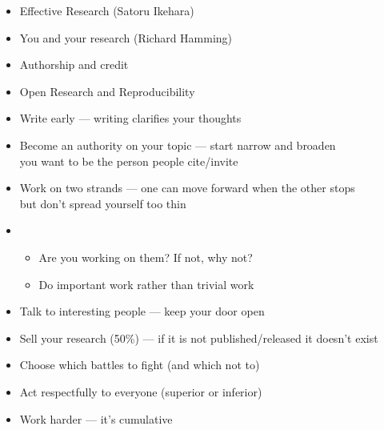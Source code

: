 \documentclass[a4paper,landscape,headrule,footrule,dvips]{foils}
\begin{document}
\begin{CJK}{UTF8}{min}
\maketitle

%



\begin{itemize}
\item Effective Research (Satoru Ikehara)
\item You and your research (Richard Hamming)
\item Authorship and credit
\item Open Research and Reproducibility
\end{itemize}


\begin{itemize}
\item Write early --- writing clarifies your thoughts
\item Become an authority on your topic --- start narrow and broaden
  \\ you want to be the person people cite/invite 
\item Work on two strands --- one can move forward when the other stops
  \\ but don't spread yourself too thin
\end{itemize}


\begin{itemize}
\item {}
  \begin{itemize}
  \item Are you working on them? If not, why not?
  \item  Do important work rather than trivial work
  \end{itemize}
\item Talk to interesting people --- keep your door open
\item Sell your research (50\%) --- if it is not published/released it doesn't exist
\item Choose which battles to fight (and which not to)
\item Act respectfully to everyone (superior or inferior)
\item Work harder --- it's cumulative
\end{itemize}



\end{CJK}
\end{document}
